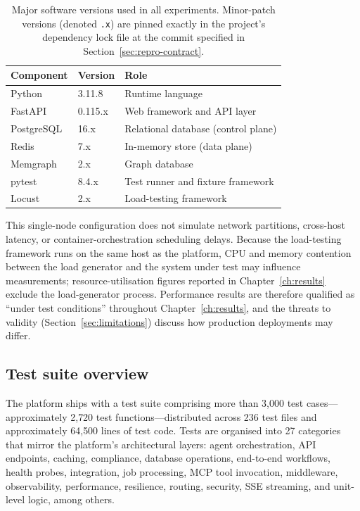 \documentclass[a4paper]{sapthesis}
\begin{document}
\begin{table}[ht]
\centering
\caption{Major software versions used in all experiments.  Minor-patch
versions (denoted \texttt{.x}) are pinned exactly in the project's
dependency lock file at the commit specified in
Section~\ref{sec:repro-contract}.}
\label{tab:software-versions}
\small
\begin{tabularx}{\textwidth}{@{}l l X@{}}
    \hline
    \textbf{Component} & \textbf{Version} & \textbf{Role} \\
    \hline
    Python          & 3.11.8       & Runtime language \\
    FastAPI~\cite{fastapi2023} & 0.115.x & Web framework and API layer \\
    PostgreSQL      & 16.x         & Relational database (control plane) \\
    Redis           & 7.x          & In-memory store (data plane) \\
    Memgraph        & 2.x          & Graph database \\
    pytest          & 8.4.x        & Test runner and fixture framework \\
    Locust          & 2.x          & Load-testing framework \\
    \hline
\end{tabularx}
\end{table}

This single-node configuration does not simulate network partitions,
cross-host latency, or container-orchestration scheduling delays.
Because the load-testing framework runs on the same host as the platform,
CPU and memory contention between the load generator and the system under
test may influence measurements; resource-utilisation figures reported in
Chapter~\ref{ch:results} exclude the load-generator process.
Performance results are therefore qualified as ``under test conditions''
throughout Chapter~\ref{ch:results}, and the threats to validity
(Section~\ref{sec:limitations}) discuss how production deployments may
differ.

\subsection{Test suite overview}
\label{sec:test-suite-overview}

The platform ships with a test suite comprising more than 3{,}000 test
cases---approximately 2{,}720 test functions---distributed across 236
test files and approximately 64{,}500 lines of test code.  Tests are organised into 27 categories that mirror
the platform's architectural layers: agent orchestration, API endpoints,
caching, compliance, database operations, end-to-end workflows, health
probes, integration, job processing, MCP tool invocation, middleware,
observability, performance, resilience, routing, security, SSE streaming,
and unit-level logic, among others.
\end{document}
